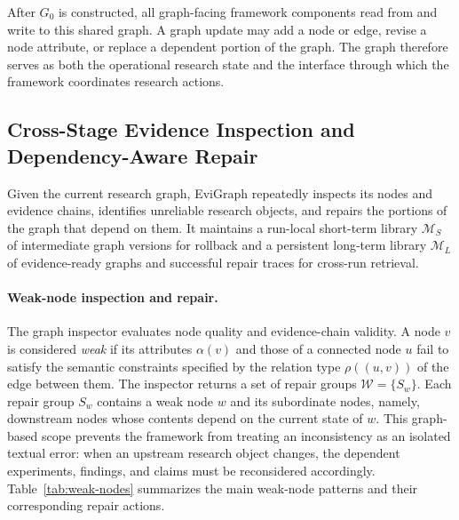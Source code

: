 \documentclass[letterpaper]{article} %
\begin{document}
After $G_0$ is constructed, all graph-facing framework components read from and write to this shared graph. A graph update may add a node or edge, revise a node attribute, or replace a dependent portion of the graph. The graph therefore serves as both the operational research state and the interface through which the framework coordinates research actions.

\subsection{Cross-Stage Evidence Inspection and Dependency-Aware Repair}
\label{sec:inspection-repair}
Given the current research graph, EviGraph repeatedly inspects its nodes and evidence chains, identifies unreliable research objects, and repairs the portions of the graph that depend on them. It maintains a run-local short-term library $\mathcal{M}_{S}$ of intermediate graph versions for rollback and a persistent long-term library $\mathcal{M}_{L}$ of evidence-ready graphs and successful repair traces for cross-run retrieval.

\paragraph{Weak-node inspection and repair.}
The graph inspector evaluates node quality and evidence-chain validity. A node $v$ is considered \emph{weak} if its attributes $\alpha(v)$ and those of a connected node $u$ fail to satisfy the semantic constraints specified by the relation type $\rho((u,v))$ of the edge between them. The inspector returns a set of repair groups $\mathcal{W}=\{S_w\}$. Each repair group $S_w$ contains a weak node $w$ and its subordinate nodes, namely, downstream nodes whose contents depend on the current state of $w$. This graph-based scope prevents the framework from treating an inconsistency as an isolated textual error: when an upstream research object changes, the dependent experiments, findings, and claims must be reconsidered accordingly. Table~\ref{tab:weak-nodes} summarizes the main weak-node patterns and their corresponding repair actions.
\end{document}
